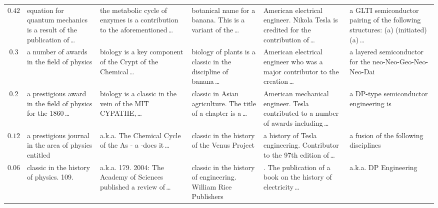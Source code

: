 \begin{table}[htbp]
\begin{tabularx}{\linewidth}{@{}c *{5}{>{\raggedright\arraybackslash}X}@{}}
$0.42$ & equation for quantum mechanics is a result of the publication of\,\dots & the metabolic cycle of enzymes is a contribution to the aforementioned\,\dots & botanical name for a banana. This is a variant of the\,\dots & American electrical engineer. Nikola Tesla is credited for the contribution of\,\dots & a GLTI semiconductor pairing of the following structures: (a) (initiated) (a)\,\dots \\
$0.3$ & a number of awards in the field of physics & biology is a key component of the Crypt of the Chemical\,\dots & biology of plants is a classic in the discipline of banana\,\dots & American electrical engineer who was a major contributor to the creation\,\dots & a layered semiconductor for the neo-Neo-Geo-Neo-Neo-Dai \\
$0.2$ & a prestigious award in the field of physics for the 1860\,\dots & biology is a classic in the vein of the MIT CYPATHE,\,\dots & classic in Asian agriculture. The title of a chapter is a\,\dots & American mechanical engineer. Tesla contributed to a number of awards including\,\dots & a DP-type semiconductor engineering is \\
$0.12$ & a prestigious journal in the area of physics entitled & a.k.a. The Chemical Cycle of the As - a -does it\,\dots & classic in the history of the Venus Project & a history of Tesla engineering. Contributor to the 97th edition of\,\dots & a fusion of the following disciplines \\
$0.06$ & classic in the history of physics. 109. & a.k.a. 179. 2004: The Academy of Sciences published a review of\,\dots & classic in the history of engineering. William Rice Publishers & 1925. The publication of a book on the history of electricity\,\dots & a.k.a. DP Engineering \\
\bottomrule
\end{tabularx}
\end{table}

